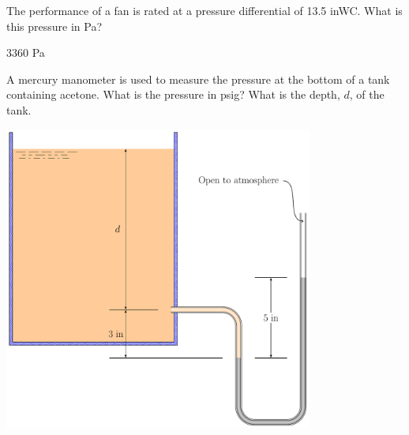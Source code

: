 \documentclass[multi,preview,varwidth=false,border=5,12pt]{standalone}
\begin{document}
\begin{question}
The performance of a fan is rated at a pressure differential of 13.5 inWC. What is this pressure in Pa?

\begin{solution}
3360 Pa
\end{solution}

\end{question}

\begin{question}
A mercury manometer is used to measure the pressure at the bottom of a tank containing acetone.  What is the pressure in psig?  What is the depth, $d$, of the tank.

\includegraphics[width=4in]{imgs/mono1.pdf}


\begin{solution}
\end{solution}

\end{question}
\end{document}
